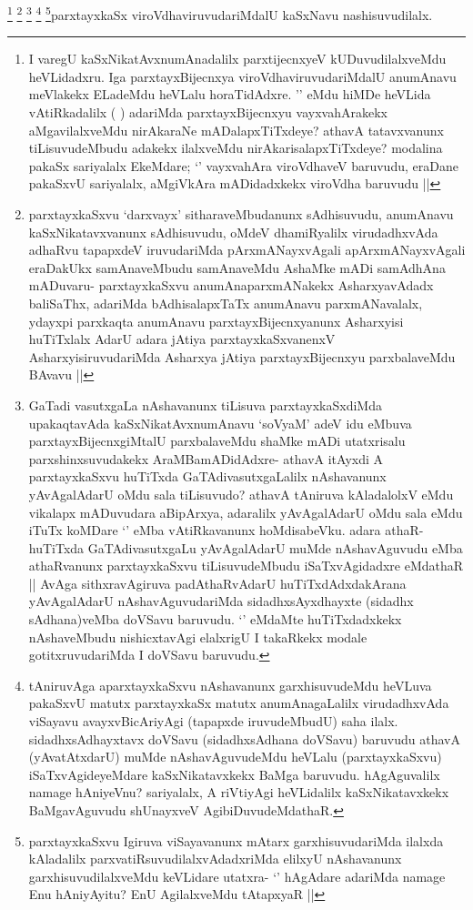 \begin{artha}
\footnote{I varegU kaSxNikatAvxnumAnadalilx parxtijecnxyeV kUDuvudilalxveMdu heVLidadxru. Iga parxtayxBijecnxya viroVdhaviruvudariMdalU anumAnavu meVlakekx ELadeMdu heVLalu horaTidAdxre. '\stext' eMdu hiMDe heVLida vAtiRkadalilx (  ) adariMda parxtayxBijecnxyu vayxvahArakekx aMgavilalxveMdu nirAkaraNe mADalapxTiTxdeye? athavA tatavxvanunx tiLisuvudeMbudu adakekx ilalxveMdu nirAkarisalapxTiTxdeye? modalina pakaSx sariyalalx EkeMdare; `\stext' vayxvahAra viroVdhaveV baruvudu, eraDane pakaSxvU sariyalalx, aMgiVkAra mADidadxkekx viroVdha baruvudu ||}
\footnote{parxtayxkaSxvu `darxvayx' sitharaveMbudanunx sAdhisuvudu, anumAnavu kaSxNikatavxvanunx sAdhisuvudu, oMdeV dhamiRyalilx virudadhxvAda adhaRvu tapapxdeV iruvudariMda pArxmANayxvAgali apArxmANayxvAgali eraDakUkx samAnaveMbudu samAnaveMdu AshaMke mADi samAdhAna mADuvaru- parxtayxkaSxvu anumAnaparxmANakekx AsharxyavAdadx baliSaThx, adariMda bAdhisalapxTaTx anumAnavu parxmANavalalx, ydayxpi parxkaqta anumAnavu parxtayxBijecnxyanunx Asharxyisi huTiTxlalx AdarU adara jAtiya parxtayxkaSxvanenxV AsharxyisiruvudariMda Asharxya jAtiya parxtayxBijecnxyu parxbalaveMdu BAvavu ||}
\footnote{GaTadi vasutxgaLa nAshavanunx tiLisuva parxtayxkaSxdiMda upakaqtavAda kaSxNikatAvxnumAnavu `soV\s yaM' adeV idu eMbuva parxtayxBijecnxgiMtalU parxbalaveMdu shaMke mADi utatxrisalu parxshinxsuvudakekx AraMBamADidAdxre- athavA itAyxdi A parxtayxkaSxvu huTiTxda GaTAdivasutxgaLalilx nAshavanunx yAvAgalAdarU oMdu sala tiLisuvudo? athavA tAniruva kAladalolxV eMdu vikalapx mADuvudara aBipArxya, adaralilx yAvAgalAdarU oMdu sala eMdu iTuTx koMDare `\stext' eMba vAtiRkavanunx hoMdisabeVku. adara athaR- huTiTxda GaTAdivasutxgaLu yAvAgalAdarU muMde nAshavAguvudu eMba athaRvanunx parxtayxkaSxvu tiLisuvudeMbudu iSaTxvAgidadxre eMdathaR || AvAga sithxravAgiruva padAthaRvAdarU huTiTxdAdxdakArana yAvAgalAdarU nAshavAguvudariMda sidadhxsAyxdhayxte (sidadhx sAdhana)veMba doVSavu baruvudu. `\stext' eMdaMte huTiTxdadxkekx nAshaveMbudu nishicxtavAgi elalxrigU I takaRkekx modale gotitxruvudariMda I doVSavu baruvudu.}
\footnote{tAniruvAga aparxtayxkaSxvu nAshavanunx garxhisuvudeMdu heVLuva pakaSxvU matutx parxtayxkaSx matutx anumAnagaLalilx virudadhxvAda viSayavu avayxvBicAriyAgi (tapapxde iruvudeMbudU) saha ilalx. sidadhxsAdhayxtavx doVSavu (sidadhxsAdhana doVSavu) baruvudu athavA (yAvatAtxdarU) muMde nAshavAguvudeMdu heVLalu (parxtayxkaSxvu) iSaTxvAgideyeMdare kaSxNikatavxkekx BaMga baruvudu. hAgAguvalilx namage hAniyeVnu? sariyalalx, A riVtiyAgi heVLidalilx kaSxNikatavxkekx BaMgavAguvudu shUnayxveV AgibiDuvudeMdathaR.}
\footnote{parxtayxkaSxvu Igiruva viSayavanunx mAtarx garxhisuvudariMda ilalxda kAladalilx parxvatiRsuvudilalxvAdadxriMda elilxyU nAshavanunx garxhisuvudilalxveMdu keVLidare utatxra- `\stext' hAgAdare adariMda namage Enu hAniyAyitu? EnU AgilalxveMdu tAtapxyaR ||}parxtayxkaSx viroVdhaviruvudariMdalU kaSxNavu nashisuvudilalx.
\end{artha}


